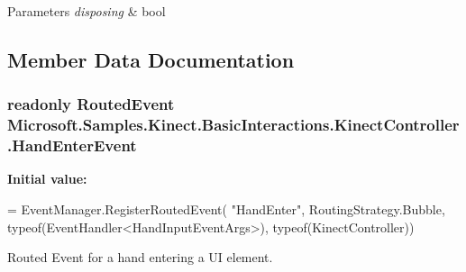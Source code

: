 \begin{DoxyParams}{Parameters}
{\em disposing} & bool \\
\hline
\end{DoxyParams}


\subsection{Member Data Documentation}
\hypertarget{class_microsoft_1_1_samples_1_1_kinect_1_1_basic_interactions_1_1_kinect_controller_a8d736bf496fd5452775107cd822a6e85}{
\subsubsection[{Hand\-Enter\-Event}]{\setlength{\rightskip}{0pt plus 5cm}readonly Routed\-Event Microsoft.\-Samples.\-Kinect.\-Basic\-Interactions.\-Kinect\-Controller.\-Hand\-Enter\-Event\hspace{0.3cm}{\ttfamily [static]}}}\label{class_microsoft_1_1_samples_1_1_kinect_1_1_basic_interactions_1_1_kinect_controller_a8d736bf496fd5452775107cd822a6e85}
{\bfseries Initial value\-:}
\begin{DoxyCode}
= EventManager.RegisterRoutedEvent(
            \textcolor{stringliteral}{"HandEnter"},
            RoutingStrategy.Bubble,
            typeof(EventHandler<HandInputEventArgs>),
            typeof(KinectController))
\end{DoxyCode}


Routed Event for a hand entering a U\-I element. 

